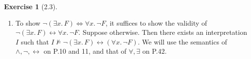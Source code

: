 \documentclass[12pt, psamsfonts]{amsart}
\theoremstyle{definition}
\newtheorem*{exer}{Exercise}
\theoremstyle{remark}
\numberwithin{equation}{subsection}
\begin{document}
\begin{exer}[2.3]
\begin{enumerate}[label=(\alph*)]
            The second branch is:
            \begin{enumerate}[label=\arabic*b.]
                \item %
                    $I \models \neg(\neg(\forall x.\, F)) \land \exists x.\, \neg F$.
                \item %
                    $I \models \exists x.\, \neg F$ by 1b and semantics of $\land$.
                \item %
                    $I \vartriangleleft \{ x \mapsto \textsf{v} \} \models \neg F$ by 2b and semantics of $\exists$ for some fresh $\textsf{v} \in D_I$.
                \item %
                    $I \vartriangleleft \{ x \mapsto \textsf{v} \} \not\models F$ by 3b and semantics of $\neg$.
                \item %
                    $I \models \neg(\neg(\forall x.\, F))$ by 1b and semantics of $\land$.
                \item %
                    $I \not\models \neg(\forall x.\, F)$ by 5b and semantics of $\neg$.
                \item %
                    $I \models \forall x.\, F$ by 6b and semantics of $\neg$.
                \item %
                    $I \vartriangleleft \{ x \mapsto \textsf{v} \} \models F$ by 7b and semantics of $\forall$ for the same \textsf{v}.
                \item %
                    $I \models \bot$ by 4b and 8b.
            \end{enumerate}

            Every branch of a semantic argument proof of $I \not\models F$ closes, so $F$ is valid by Theorem 2.30.
        \item %
            To show $\neg (\exists x.\, F) \Leftrightarrow \forall x.\, \neg F$, it suffices to show the validity of $\neg(\exists x.\, F) \leftrightarrow \forall x.\, \neg F$.
            Suppose otherwise.
            Then there exists an interpretation $I$ such that $I \not\models \neg(\exists x.\, F) \leftrightarrow (\forall x.\, \neg F)$.
            We will use the semantics of $\land, \neg, \leftrightarrow$ on P.10 and 11, and that of $\forall, \exists$ on P.42.


\end{enumerate}
\end{exer}
\end{document}
